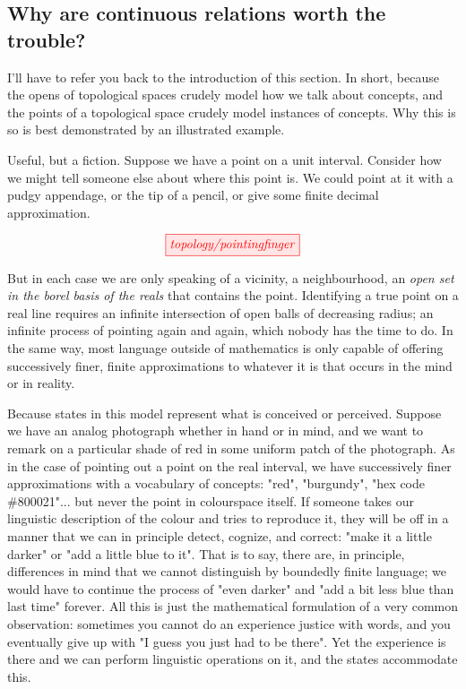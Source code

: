 \begin{fullwidth}
\subsection{Why are continuous relations worth the trouble?}
I'll have to refer you back to the introduction of this section. In short, because the opens of topological spaces crudely model how we talk about concepts, and the points of a topological space crudely model instances of concepts. Why this is so is best demonstrated by an illustrated example.

 Useful, but a fiction. Suppose we have a point on a unit interval. Consider how we might tell someone else about where this point is. We could point at it with a pudgy appendage, or the tip of a pencil, or give some finite decimal approximation.

\[\tikzfig{topology/pointingfinger}\]

But in each case we are only speaking of a vicinity, a neighbourhood, an \emph{open set in the borel basis of the reals} that contains the point. Identifying a true point on a real line requires an infinite intersection of open balls of decreasing radius; an infinite process of pointing again and again, which nobody has the time to do. In the same way, most language outside of mathematics is only capable of offering successively finer, finite approximations to whatever it is that occurs in the mind or in reality.

 Because states in this model represent what is conceived or perceived. Suppose we have an analog photograph whether in hand or in mind, and we want to remark on a particular shade of red in some uniform patch of the photograph. As in the case of pointing out a point on the real interval, we have successively finer approximations with a vocabulary of concepts: "red", "burgundy", "hex code \#800021"... but never the point in colourspace itself. If someone takes our linguistic description of the colour and tries to reproduce it, they will be off in a manner that we can in principle detect, cognize, and correct: "make it a little darker" or "add a little blue to it". That is to say, there are, in principle, differences in mind that we cannot distinguish by boundedly finite language; we would have to continue the process of "even darker" and "add a bit less blue than last time" forever. All this is just the mathematical formulation of a very common observation: sometimes you cannot do an experience justice with words, and you eventually give up with "I guess you just had to be there". Yet the experience is there and we can perform linguistic operations on it, and the states accommodate this.


\end{fullwidth}
